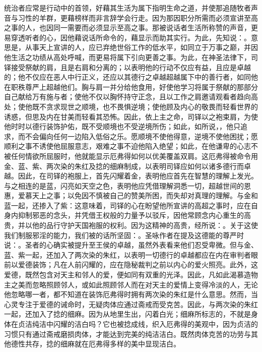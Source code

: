 统治者应常是行动中的首领，好藉其生活为属下指明生命之道，并使那追随牧者声音与习性的羊群，更藉榜样而非言辞学会行走。因为那因职分所需而必须宣讲至高之事的人，也因同一需要而必须显示至高之事。那被说话者生活所称赞的声音，更易穿透听者的心，因他藉说话所命令的，藉显示而助其实行。为此，先知说：。意思是，从事天上宣讲的人，应已弃绝世俗工作的低水平，如同立于万事之巅，并因他生活之功绩从高处呼喊，而更易将属下引向更善之事。为此，在神圣法律下，司铎接受祭献的肩，且是右肩和分离的；以表明他的行动不仅应有益，且应是卓越的；他不仅应在恶人中行正义，还应以其德行之卓越超越属下中的善行者，如同他在职秩尊严上超越他们。胸与肩一并分给他食用，好使他学习将属于祭献的那部分自己献给万有施与者；使他不仅以胸怀持守正念，且以工作之肩邀请观看者趋向高处；使他既不贪求现世之顺境，也不畏惧逆境；使他顾及内心的敬畏而轻看世界的诱惑，但思及内在甘美而轻看其恐怖。因此，依上主之命，司铎以之袍束肩，为使他时时以德行装饰护佑，既不受顺境也不受逆境所伤；如此，如所说，，他只追求，而不会偏向任何一边陷入低俗之乐。愿顺境不使他得意，逆境不使他困扰；愿顺利之事不诱使他屈服意志，艰难之事不迫他陷入绝望；如此，在他谦卑的心志不被任何情欲所屈服时，他就能显示厄弗得如何以优美覆盖双肩。这厄弗得被命令用金、蓝、紫、两次染的朱红及捻的细麻制成，以表明司铎应如何以诸多德行而卓越。因此，在司铎的袍服上，首先闪耀着金，表明他应首先在智慧的理解上发光。与之相连的是蓝，闪亮如天空之色，表明他应凭借理解洞悉一切，超越世间的恩惠，爱慕天上之事；以免因不慎被自己的赞美所困，而失却对真理的理解。与金和蓝一起，还掺入了紫：这意味着，司铎的心在盼望他所宣讲的高超之事时，应在自身内抑制邪恶的念头，并凭借王权般的力量予以驳斥，因他常顾念内心重生的高贵，并以他的品行守护天国袍服的权利。因为这精神的高贵，经所说：。关于这使我们制服邪淫的能力，我们被的话所坚固：。圣咏作者在提及这德能的尊严时说：。圣者的心确实被提升至王侯的卓越，虽然外表看来他们忍受卑微。但与金、蓝、紫一起，还加入了两次染的朱红，以表明一切德行的卓越都应在内在审判者眼前以爱德装饰；凡在人前闪耀的，应在隐秘裁判之前以内心的爱火照亮。此外，这爱德，既然包含对天主和邻人的爱，便如同有双重的光泽。因此，凡如此渴慕造物主之美而忽略照顾邻人，或如此照顾邻人而在对天主的爱情上变得冷淡的人，无论他忽略哪一者，都不知道在装饰厄弗得时拥有两次染的朱红是什么意思。然而，当心灵专注于爱德的诫命时，无疑肉体应通过斋戒而受克苦。因此，与两次染的朱红一起，还加入了捻的细麻。因为从地里生出，闪着白光；细麻所标志的，不就是身体在贞洁纯洁中闪耀的洁白吗？它也被捻成线，织入厄弗得的美观中，因为贞洁的习惯只有通过斋戒磨损肉体，才能达到完美的纯洁洁白。既然肉体克苦的功劳与其他德性共存，捻的细麻就在厄弗得多样的美中显现洁白。\par

